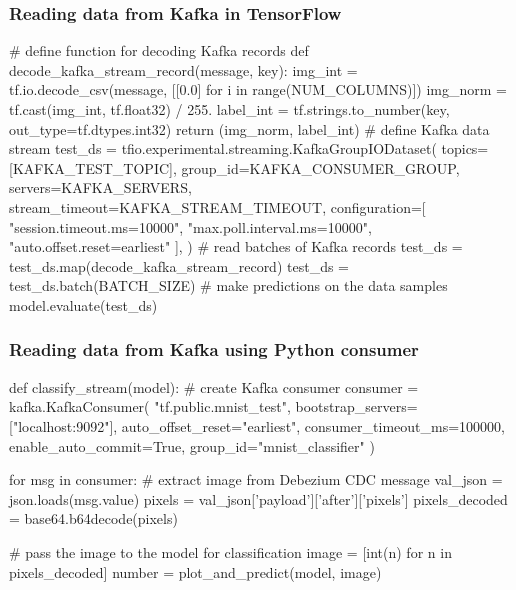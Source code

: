 \documentclass[10pt,utf8]{beamer}
\begin{document}
\begin{frame}[fragile]
    \frametitle{Reading data from Kafka in TensorFlow}
    \vspace{-0.2cm}
    \footnotesize
    \begin{python}
# define function for decoding Kafka records
def decode_kafka_stream_record(message, key):
    img_int = tf.io.decode_csv(message, [[0.0] for i in range(NUM_COLUMNS)])
    img_norm = tf.cast(img_int, tf.float32) / 255.
    label_int = tf.strings.to_number(key, out_type=tf.dtypes.int32)
    return (img_norm, label_int)
# define Kafka data stream
test_ds = tfio.experimental.streaming.KafkaGroupIODataset(
    topics=[KAFKA_TEST_TOPIC],
    group_id=KAFKA_CONSUMER_GROUP,
    servers=KAFKA_SERVERS,
    stream_timeout=KAFKA_STREAM_TIMEOUT,
    configuration=[
        "session.timeout.ms=10000",
        "max.poll.interval.ms=10000",
        "auto.offset.reset=earliest"
    ],
)
# read batches of Kafka records
test_ds = test_ds.map(decode_kafka_stream_record)
test_ds = test_ds.batch(BATCH_SIZE)
# make predictions on the data samples
model.evaluate(test_ds)
    \end{python}
\end{frame}

\begin{frame}[fragile]
    \frametitle{Reading data from Kafka using Python consumer}
    \vspace{-0.2cm}
    \footnotesize
    \begin{python}
def classify_stream(model):
    # create Kafka consumer
    consumer = kafka.KafkaConsumer(
        "tf.public.mnist_test",
        bootstrap_servers=["localhost:9092"],
        auto_offset_reset="earliest",
        consumer_timeout_ms=100000,
        enable_auto_commit=True,
        group_id="mnist_classifier"
    )
    
    for msg in consumer:
        # extract image from Debezium CDC message
        val_json = json.loads(msg.value)
        pixels = val_json['payload']['after']['pixels']
        pixels_decoded = base64.b64decode(pixels)
        
        # pass the image to the model for classification
        image  = [int(n) for n in pixels_decoded]
        number = plot_and_predict(model, image)
    \end{python}
\end{frame}
\end{document}
